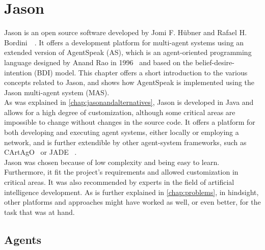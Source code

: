 \documentclass[draft,final]{vutinfth} %
\begin{document}
\section{Jason}
\label{chap:jason}

Jason is an open source software developed by Jomi F. Hübner and Rafael H. Bordini~\cite{bordini2004jason}~\cite{Bordini:2007:PMS:1197104}.
It offers a development platform for multi-agent systems using an extended version of AgentSpeak (AS), which is an agent-oriented programming language designed by Anand Rao in 1996~\cite{rao1996agentspeak} and based on the belief-desire-intention (BDI) model. 
This chapter offers a short introduction to the various concepts related to Jason, and shows how AgentSpeak is implemented using the Jason multi-agent system (MAS). \\
As was explained in \autoref{chap:jasonandalternatives}, Jason is developed in Java and allows for a high degree of customization, although some critical areas are impossible to change without changes in the source code.
It offers a platform for both developing and executing agent systems, either locally or employing a network, and is further extendible by other agent-system frameworks, such as CArtAgO~\cite{ricci2006cartago} or JADE ~\cite{bellifemine1999jade}. \\
Jason was chosen because of low complexity and being easy to learn. 
Furthermore, it fit the project’s requirements and allowed customization in critical areas. 
It was also recommended by experts in the field of artificial intelligence development. 
As is further explained in \autoref{chap:problems}, in hindsight, other platforms and approaches might have worked as well, or even better, for the task that was at hand.

\subsection{Agents}
\label{chap:agents}
\end{document}
